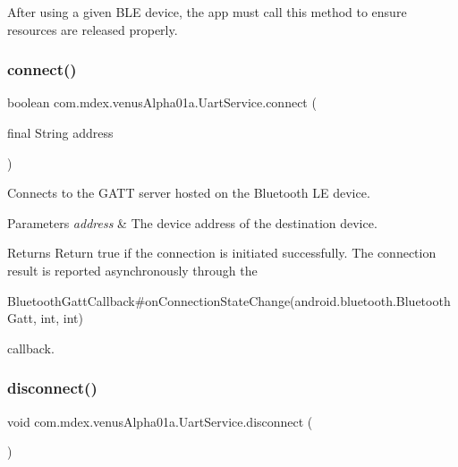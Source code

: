 After using a given B\+LE device, the app must call this method to ensure resources are released properly. \mbox{\label{classcom_1_1mdex_1_1venus_alpha01a_1_1_uart_service_ae8c6637fcc70c1784e6b9b1123d5cb36}} 
\subsubsection{\texorpdfstring{connect()}{connect()}}
{\footnotesize\ttfamily boolean com.\+mdex.\+venus\+Alpha01a.\+Uart\+Service.\+connect (\begin{DoxyParamCaption}\item[{final String}]{address }\end{DoxyParamCaption})}

Connects to the G\+A\+TT server hosted on the Bluetooth LE device.


\begin{DoxyParams}{Parameters}
{\em address} & The device address of the destination device.\\
\hline
\end{DoxyParams}
\begin{DoxyReturn}{Returns}
Return true if the connection is initiated successfully. The connection result is reported asynchronously through the 
\begin{DoxyCode}
BluetoothGattCallback#onConnectionStateChange(android.bluetooth.BluetoothGatt, \textcolor{keywordtype}{int}, \textcolor{keywordtype}{int}) 
\end{DoxyCode}
 callback. 
\end{DoxyReturn}
\mbox{\label{classcom_1_1mdex_1_1venus_alpha01a_1_1_uart_service_a74a3d79f13944b102c44ca20ebd5ebcf}} 
\subsubsection{\texorpdfstring{disconnect()}{disconnect()}}
{\footnotesize\ttfamily void com.\+mdex.\+venus\+Alpha01a.\+Uart\+Service.\+disconnect (\begin{DoxyParamCaption}{ }\end{DoxyParamCaption})}

